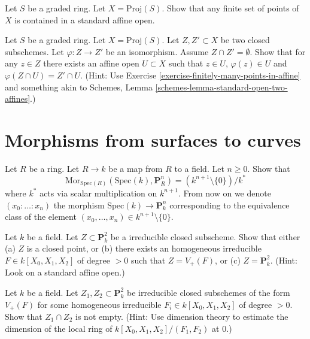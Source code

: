 \begin{exercise}
\label{exercise-finitely-many-points-in-affine}
Let $S$ be a graded ring.
Let $X = \text{Proj}(S)$.
Show that any finite set of points of $X$ is contained in a standard
affine open.
\end{exercise}

\begin{exercise}
\label{exercise-prepare-glueing}
Let $S$ be a graded ring.
Let $X = \text{Proj}(S)$.
Let $Z, Z' \subset X$ be two closed subschemes.
Let $\varphi : Z \to Z'$ be an isomorphism.
Assume $Z \cap Z' = \emptyset$.
Show that for any $z \in Z$ there exists an affine
open $U \subset X$ such that $z \in U$, $\varphi(z) \in U$ and
$\varphi(Z \cap U) = Z' \cap U$.
(Hint: Use Exercise \ref{exercise-finitely-many-points-in-affine}
and something akin to
Schemes, Lemma \ref{schemes-lemma-standard-open-two-affines}.)
\end{exercise}










\section{Morphisms from surfaces to curves}
\label{section-from-surfaces-to-curves}

\begin{exercise}
\label{exercise-points-projective-space}
Let $R$ be a ring.
Let $R \to k$ be a map from $R$ to a field.
Let $n \geq 0$.
Show that
$$
\text{Mor}_{\text{Spec}(R)}(\text{Spec}(k), \mathbf{P}^n_R)
=
(k^{n + 1} \setminus \{0\})/k^*
$$
where $k^*$ acts via scalar multiplication on $k^{n + 1}$.
From now on we denote $(x_0 : \ldots : x_n)$ the
morphism $\text{Spec}(k) \to \mathbf{P}^n_k$ corresponding
to the equivalence class of the element
$(x_0, \ldots, x_n) \in k^{n + 1} \setminus \{0\}$.
\end{exercise}

\begin{exercise}
\label{exercise-curve-projective-plane}
Let $k$ be a field. Let $Z \subset \mathbf{P}^2_k$ be a
irreducible closed subscheme.
Show that either (a) $Z$ is a closed point, or (b) there exists
an homogeneous irreducible $F \in k[X_0, X_1, X_2]$ of degree $> 0$
such that $Z = V_{+}(F)$, or (c) $Z = \mathbf{P}^2_k$.
(Hint: Look on a standard affine open.)
\end{exercise}

\begin{exercise}
\label{exercise-bezout}
Let $k$ be a field. Let $Z_1, Z_2 \subset \mathbf{P}^2_k$ be
irreducible closed subschemes of the form $V_{+}(F)$
for some homogeneous irreducible $F_i \in k[X_0, X_1, X_2]$ of degree $> 0$.
Show that $Z_1 \cap Z_2$ is not empty.
(Hint: Use dimension theory to estimate the dimension of
the local ring of $k[X_0, X_1, X_2]/(F_1, F_2)$ at $0$.)
\end{exercise}

